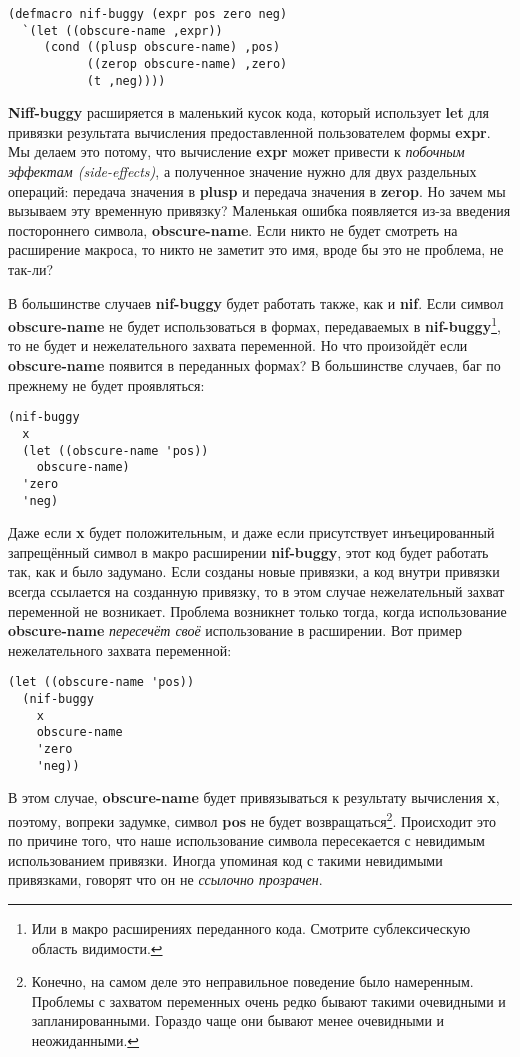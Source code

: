 \begin{verbatim}
(defmacro nif-buggy (expr pos zero neg)
  `(let ((obscure-name ,expr))
     (cond ((plusp obscure-name) ,pos)
           ((zerop obscure-name) ,zero)
           (t ,neg))))
\end{verbatim}

 \textbf{Niff-buggy} расширяется в маленький кусок кода, который использует \textbf{let} для привязки результата вычисления предоставленной пользователем формы \textbf{expr}. Мы делаем это потому, что вычисление \textbf{expr} может привести к \emph{побочным эффектам (side-effects)}, а полученное значение нужно для двух раздельных операций: передача значения в \textbf{plusp} и передача значения в \textbf{zerop}. Но зачем мы вызываем эту временную привязку? Маленькая ошибка появляется из-за введения постороннего символа, \textbf{obscure-name}. Если никто не будет смотреть на расширение макроса, то никто не заметит это имя, вроде бы это не проблема, не так-ли?

В большинстве случаев \textbf{nif-buggy} будет работать также, как и \textbf{nif}. Если символ \textbf{obscure-name} не будет использоваться в формах, передаваемых в \textbf{nif-buggy}\footnote{Или в макро расширениях переданного кода. Смотрите сублексическую область видимости.}, то не будет и нежелательного захвата переменной. Но что произойдёт если \textbf{obscure-name} появится в переданных формах? В большинстве случаев, баг по прежнему не будет проявляться:

\begin{verbatim}
(nif-buggy
  x
  (let ((obscure-name 'pos))
    obscure-name)
  'zero
  'neg)
\end{verbatim}

Даже если  \textbf{x} будет положительным, и даже если присутствует инъецированный запрещённый символ в макро расширении  \textbf{nif-buggy}, этот код будет работать так, как и было задумано. Если созданы новые привязки, а код внутри привязки всегда ссылается на созданную привязку, то в этом случае нежелательный захват переменной не возникает. Проблема возникнет только тогда, когда использование  \textbf{obscure-name}  \emph{пересечёт своё} использование в расширении. Вот пример нежелательного захвата переменной:

\begin{verbatim}
(let ((obscure-name 'pos))
  (nif-buggy
    x
    obscure-name
    'zero
    'neg))
\end{verbatim}

В этом случае, \textbf{obscure-name} будет привязываться к результату вычисления \textbf{x}, поэтому, вопреки задумке, символ \textbf{pos} не будет возвращаться\footnote{Конечно, на самом деле это неправильное поведение было намеренным. Проблемы с захватом переменных очень редко бывают такими очевидными и запланированными. Гораздо чаще они бывают менее очевидными и неожиданными.}. Происходит это по причине того, что наше использование символа пересекается с невидимым использованием привязки. Иногда упоминая код с такими невидимыми привязками, говорят что он не \emph{ссылочно прозрачен}.

